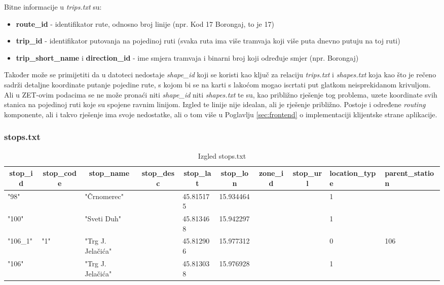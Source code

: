 \documentclass[zavrsnirad]{fer}
\begin{document}
Bitne informacije u \textit{trips.txt} su:
\begin{itemize}
	\item \textbf{route\_id} - identifikator rute, odnosno broj linije (npr. Kod 17 Borongaj, to je 17)
	\item \textbf{trip\_id} - identifikator putovanja na pojedinoj ruti (svaka ruta ima više tramvaja koji više puta dnevno putuju na toj ruti)
	\item \textbf{trip\_short\_name} i \textbf{direction\_id} - ime smjera tramvaja i binarni broj koji određuje smjer (npr. Borongaj)
\end{itemize}

Također može se primijetiti da u datoteci nedostaje \textit{shape\_id} koji se koristi kao ključ za relaciju \textit{trips.txt} i \textit{shapes.txt} koja kao što je rečeno sadrži detaljne koordinate putanje pojedine rute, s kojom bi se na karti s lakoćom mogao iscrtati put glatkom neisprekidanom krivuljom.
Ali u ZET-ovim podacima se ne može pronaći niti \textit{shape\_id} niti \textit{shapes.txt} te su, kao približno rješenje tog problema, uzete koordinate svih stanica na pojedinoj ruti koje su spojene ravnim linijom. Izgled te linije nije idealan, ali je rješenje približno. Postoje i određene \textit{routing} komponente, ali i takvo rješenje ima svoje nedostatke, ali o tom više u Poglavlju \ref{sec:frontend} o implementaciji klijentske strane aplikacije.
\newpage
\subsubsection{stops.txt}

\begin{table}[htb]
	\begin{adjustbox}{width=\columnwidth,center}
	\begin{tabular}{l|l|l|l|l|l|l|l|l|l}
		\hline
		\multicolumn{1}{c|}{\textbf{stop\_id}} & \multicolumn{1}{c|}{\textbf{stop\_code}} & \multicolumn{1}{c|}{\textbf{stop\_name}} & \multicolumn{1}{c|}{\textbf{stop\_desc}} & \multicolumn{1}{c|}{\textbf{stop\_lat}} & \multicolumn{1}{c|}{\textbf{stop\_lon}} & \multicolumn{1}{c|}{\textbf{zone\_id}} & \multicolumn{1}{c|}{\textbf{stop\_url}} & \textbf{location\_type} & \textbf{parent\_station} \\ \hline
		"98" &  & "Črnomerec" &  & 45.815175 & 15.934464 &  &  & 1 &  \\ \hline
		"100" &  & "Sveti Duh" &  & 45.813468 & 15.942297 &  &  & 1 &  \\ \hline
		"106\_1" & "1" & "Trg J. Jelačića" &  & 45.812906 & 15.977312 &  &  & 0 & 106 \\ \hline
		"106" &  & "Trg J. Jelačića" &  & 45.813038 & 15.976928 &  &  & 1 &  \\ \hline
	\end{tabular}
	\end{adjustbox}
	\caption{Izgled stops.txt}
	\label{tbl:stops}
\end{table}
\end{document}
